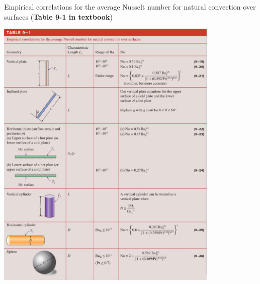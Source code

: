 \begin{table}[H]
    \centering
    \caption{Empirical correlations for the average Nusselt number for natural convection over surfaces 
    (\textbf{Table 9-1 in textbook})}
    \includegraphics[width=0.8\textwidth]{Figures/sec9 table 9-1.jpg}
    \label{tab:sec9_natural_convection_over_surfaces}
\end{table}

